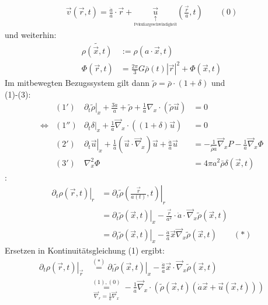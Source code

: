 \begin{itemize}
\begin{align*}
			\vec{v}(\vec{r},t)=\frac{\dot{a}}{a}\cdot\vec{r}+\underset{\underset{\text{Pekuliargeschwindigkeit}}{\uparrow}}{\vec{u}}\left(\frac{\vec{r}}{a},t\right) \qquad (0)
		\end{align*}
		und weiterhin:
		\begin{align*}
			\tilde{\rho(\vec{x},t)}&:=\rho(a\cdot\vec{x},t)\\
			\Phi(\vec{r},t)&=\frac{2\pi}{3}G\bar{\rho}(t)\left|\vec{r}\right|^2+ \Phi(\vec{x},t)
		\end{align*}
		Im mitbewegten Bezugssystem gilt dann $\tilde{\rho}=\bar{\rho}\cdot\left(1+\delta\right)$ und\\
		(1)-(3):
		\begin{align*}
			&(1') & \left.\partial_t\tilde\rho\right|_x+\frac{3\dot{a}}{a}+\tilde{\rho} +\frac{1}{a}\nabla_x\cdot(\tilde{\rho}\vec{u})&=0\\
			\Leftrightarrow &(1'') & \left.\partial_t\delta\right|_x+\frac{1}{a}\vec{\nabla}_x\cdot\left((1+\delta)\vec{u}\right)&=0\\
			&(2') & \left.\partial_t\vec{u}\right|_x+\frac{1}{a}\left(\vec{u}\cdot\vec{\nabla}_x\right)\vec{u}+\frac{\dot{a}}{a}\vec{u}&=-\frac{1}{\tilde{\rho}a}\vec{\nabla}_x P-\frac{1}{a}\vec{\nabla}_x\Phi\\
			&(3') & \nabla_x^2\Phi&=4\pi a^2\bar{\rho}\delta(\vec{x},t)
		\end{align*}
		\textbf{\underline{}}:
		\begin{align*}
			\left.\partial_t\rho(\vec{r},t)\right|_r&=\left.\partial_t\tilde{\rho}\left(\frac{\vec{r}}{a(t)},t\right)\right|_r\\
			&=\left.\partial_t\tilde{\rho}(\vec{x},t)\right|_x -\frac{\vec{r}}{a^2}\cdot\dot{a}\cdot\vec{\nabla}_x\tilde{\rho}(\vec{x},t)\\
			&=\left.\partial_t\tilde{\rho}(\vec{x},t)\right|_x-\frac{\dot{a}}{a}\vec{x}\vec{\nabla}_x\tilde{\rho}(\vec{x},t) \qquad (\ast)
		\end{align*}
		Ersetzen in Kontinuitätsgleichung (1) ergibt:
		\begin{align*}
			\left.\partial_t\rho(\vec{r},t)\right|_{\vec{r}}&\overset{(\ast)}{=}\left.\partial_t\tilde{\rho}(\vec{x},t)\right|_x-\frac{\dot{a}}{a}\vec{x}\cdot\vec{\nabla}_x\tilde{\rho}(\vec{x},t)\\
			&\underset{\vec{\nabla}_r=\frac{1}{a}\vec{\nabla}_x}{\overset{(1),(0)}{=}} -\frac{1}{a}\vec{\nabla}_x\cdot\left(\tilde{\rho}(\vec{x},t)\left(\dot{a}\vec{x}+\vec{u}(\vec{x},t)\right)\right)\\

\end{align*}
\end{itemize}
